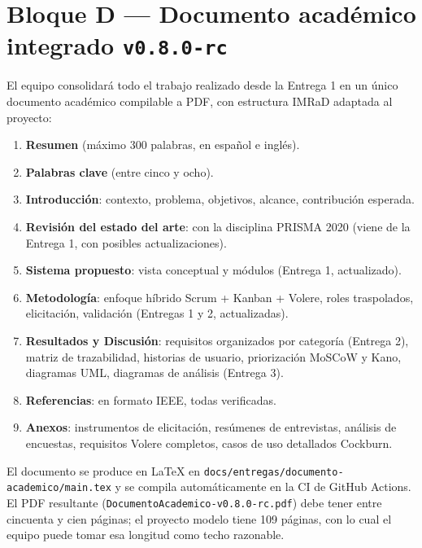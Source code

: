 \documentclass[11pt,a4paper]{article}
\begin{document}
\section{Bloque D --- Documento acad\'emico integrado \texttt{v0.8.0-rc}}

El equipo consolidar\'a todo el trabajo realizado desde la Entrega 1 en un \'unico documento acad\'emico compilable a PDF, con estructura IMRaD adaptada al proyecto:

\begin{enumerate}
    \item \textbf{Resumen} (m\'aximo 300 palabras, en espa\~nol e ingl\'es).
    \item \textbf{Palabras clave} (entre cinco y ocho).
    \item \textbf{Introducci\'on}: contexto, problema, objetivos, alcance, contribuci\'on esperada.
    \item \textbf{Revisi\'on del estado del arte}: con la disciplina PRISMA 2020 (viene de la Entrega 1, con posibles actualizaciones).
    \item \textbf{Sistema propuesto}: vista conceptual y m\'odulos (Entrega 1, actualizado).
    \item \textbf{Metodolog\'ia}: enfoque h\'ibrido Scrum + Kanban + Volere, roles traspolados, elicitaci\'on, validaci\'on (Entregas 1 y 2, actualizadas).
    \item \textbf{Resultados y Discusi\'on}: requisitos organizados por categor\'ia (Entrega 2), matriz de trazabilidad, historias de usuario, priorizaci\'on MoSCoW y Kano, diagramas UML, diagramas de an\'alisis (Entrega 3).
    \item \textbf{Referencias}: en formato IEEE, todas verificadas.
    \item \textbf{Anexos}: instrumentos de elicitaci\'on, res\'umenes de entrevistas, an\'alisis de encuestas, requisitos Volere completos, casos de uso detallados Cockburn.
\end{enumerate}

El documento se produce en LaTeX en \texttt{docs/entregas/documento-academico/main.tex} y se compila autom\'aticamente en la CI de GitHub Actions. El PDF resultante (\texttt{DocumentoAcademico-v0.8.0-rc.pdf}) debe tener entre cincuenta y cien p\'aginas; el proyecto modelo tiene 109 p\'aginas, con lo cual el equipo puede tomar esa longitud como techo razonable.
\end{document}
